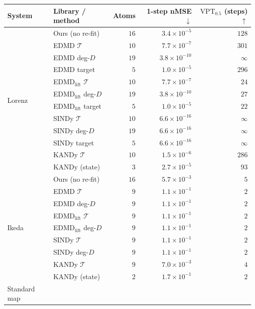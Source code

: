 \begin{table}[ht]
\centering
{\color{blue}
\small
\setlength{\tabcolsep}{4pt}
\renewcommand{\arraystretch}{1.1}
\begin{tabular}{@{}llrrr@{}}
\toprule
System & Library / method & Atoms & 1-step nMSE $\downarrow$ & $\mathrm{VPT}_{0.5}$ (steps) $\uparrow$ \\
\midrule
\multirow{12}{*}{Lorenz}
 & Ours (no re-fit) & $16$ & $3.4\times10^{-5}$ & $128$ \\
 & EDMD $\mathcal{T}$ & $10$ & $7.7\times10^{-7}$ & $301$ \\
 & EDMD deg-$D$ & $19$ & $3.8\times10^{-10}$ & $\infty$ \\
 & EDMD target & $5$ & $1.0\times10^{-5}$ & $296$ \\
 & EDMD$_{\mathrm{lift}}$ $\mathcal{T}$ & $10$ & $7.7\times10^{-7}$ & $24$ \\
 & EDMD$_{\mathrm{lift}}$ deg-$D$ & $19$ & $3.8\times10^{-10}$ & $27$ \\
 & EDMD$_{\mathrm{lift}}$ target & $5$ & $1.0\times10^{-5}$ & $22$ \\
 & SINDy $\mathcal{T}$ & $10$ & $6.6\times10^{-16}$ & $\infty$ \\
 & SINDy deg-$D$ & $19$ & $6.6\times10^{-16}$ & $\infty$ \\
 & SINDy target & $5$ & $6.6\times10^{-16}$ & $\infty$ \\
 & KANDy $\mathcal{T}$ & $10$ & $1.5\times10^{-6}$ & $286$ \\
 & KANDy (state) & $3$ & $2.7\times10^{-5}$ & $93$ \\
\midrule
\multirow{9}{*}{Ikeda}
 & Ours (no re-fit) & $16$ & $5.7\times10^{-3}$ & $5$ \\
 & EDMD $\mathcal{T}$ & $9$ & $1.1\times10^{-1}$ & $2$ \\
 & EDMD deg-$D$ & $9$ & $1.1\times10^{-1}$ & $2$ \\
 & EDMD$_{\mathrm{lift}}$ $\mathcal{T}$ & $9$ & $1.1\times10^{-1}$ & $2$ \\
 & EDMD$_{\mathrm{lift}}$ deg-$D$ & $9$ & $1.1\times10^{-1}$ & $2$ \\
 & SINDy $\mathcal{T}$ & $9$ & $1.1\times10^{-1}$ & $2$ \\
 & SINDy deg-$D$ & $9$ & $1.1\times10^{-1}$ & $2$ \\
 & KANDy $\mathcal{T}$ & $9$ & $7.0\times10^{-3}$ & $4$ \\
 & KANDy (state) & $2$ & $1.7\times10^{-1}$ & $2$ \\
\midrule
\multirow{9}{*}{Standard map}

\end{tabular}}
\end{table}
